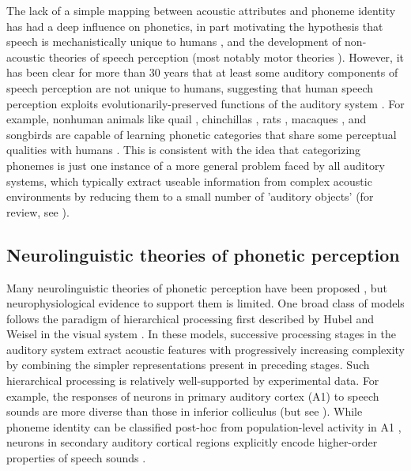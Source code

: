 The lack of a simple mapping between acoustic attributes and phoneme identity has had a deep influence on phonetics, in part motivating the hypothesis that speech is mechanistically unique to humans \citep{Lieberman1984}, and the development of non-acoustic theories of speech perception (most notably motor theories \citep{Diehl2004,Liberman1967,Liberman1985}). However, it has been clear for more than 30 years that at least some auditory components of speech perception are not unique to humans, suggesting that human speech perception exploits evolutionarily-preserved functions of the auditory system \citep{Kluender1987,Carbonell2014,Ghazanfar1999,Bornkessel-Schlesewsky2015}. For example, nonhuman animals like quail \citep{Kluender1987, Kluender1994}, chinchillas \citep{Kuhl1978}, rats \citep{Engineer2015}, macaques \citep{Kuhl1983}, and songbirds \citep{Dooling1995} are capable of learning phonetic categories that share some perceptual qualities with humans \citep{Lotto1997,Kluender2000}. This is consistent with the idea that categorizing phonemes is just one instance of a more general problem faced by all auditory systems, which typically extract useable information from complex acoustic environments by reducing them to a small number of 'auditory objects' (for review, see \citep{Bizley2013}).%
%
\subsection{Neurolinguistic theories of phonetic perception}

Many neurolinguistic theories of phonetic perception have been proposed \citep{Rauschecker2009a,Strauss2007,Kluender2013a,Liberman1985,Gaskell1997}, but neurophysiological evidence to support them is limited. One broad class of models follows the paradigm of hierarchical processing first described by Hubel and Weisel in the visual system \citep{Rauschecker2009a,Hubel1962,Strauss2007}. In these models, successive processing stages in the auditory system extract acoustic features with progressively increasing complexity by combining the simpler representations present in preceding stages. Such hierarchical processing is relatively well-supported by experimental data. For example, the responses of neurons in primary auditory cortex (A1) to speech sounds are more diverse than those in inferior colliculus \citep{Ranasinghe2013} (but see \citep{Bartlett2013}). While phoneme identity can be classified post-hoc from population-level activity in A1 \citep{Centanni2013,Engineer2008,Steinschneider2003}, neurons in secondary auditory cortical regions explicitly encode higher-order properties of speech sounds \citep{Mesgarani2014,Belin2000a,Chang2010,Pasley2012,Bidelman2013}.

